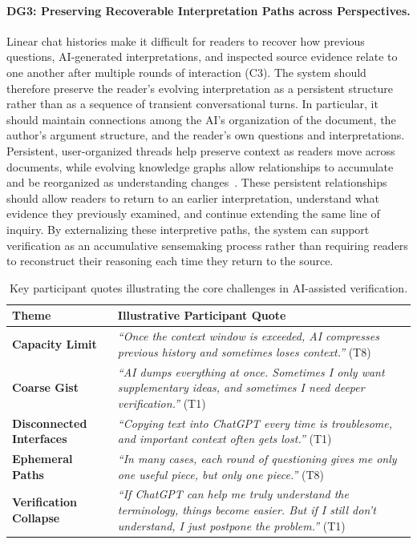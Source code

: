 \documentclass[manuscript,review,anonymous]{acmart}
\begin{document}
\paragraph{\textbf{DG3: Preserving Recoverable Interpretation Paths across Perspectives.}}
Linear chat histories make it difficult for readers to recover how previous questions, AI-generated interpretations, and inspected source evidence relate to one another after multiple rounds of interaction (C3). The system should therefore preserve the reader's evolving interpretation as a persistent structure rather than as a sequence of transient conversational turns. In particular, it should maintain connections among the AI's organization of the document, the author's argument structure, and the reader's own questions and interpretations. Persistent, user-organized threads help preserve context as readers move across documents, while evolving knowledge graphs allow relationships to accumulate and be reorganized as understanding changes~\cite{threddy,mindtrellis}. These persistent relationships should allow readers to return to an earlier interpretation, understand what evidence they previously examined, and continue extending the same line of inquiry. By externalizing these interpretive paths, the system can support verification as an accumulative sensemaking process rather than requiring readers to reconstruct their reasoning each time they return to the source.
\begin{table}[t]
\centering
\caption{Key participant quotes illustrating the core challenges in AI-assisted verification.}
\label{tab:quotes}
\small
\begin{tabularx}{\linewidth}{l X}
\toprule
\textbf{Theme} & \textbf{Illustrative Participant Quote} \\
\midrule
\textbf{Capacity Limit} & \textit{``Once the context window is exceeded, AI compresses previous history and sometimes loses context.''} (T8) \\
\textbf{Coarse Gist} & \textit{``AI dumps everything at once. Sometimes I only want supplementary ideas, and sometimes I need deeper verification.''} (T1) \\
\textbf{Disconnected Interfaces} & \textit{``Copying text into ChatGPT every time is troublesome, and important context often gets lost.''} (T1) \\
\textbf{Ephemeral Paths} & \textit{``In many cases, each round of questioning gives me only one useful piece, but only one piece.''} (T8) \\
\textbf{Verification Collapse} & \textit{``If ChatGPT can help me truly understand the terminology, things become easier. But if I still don't understand, I just postpone the problem.''} (T1) \\
\bottomrule
\end{tabularx}
\end{table}
\end{document}
